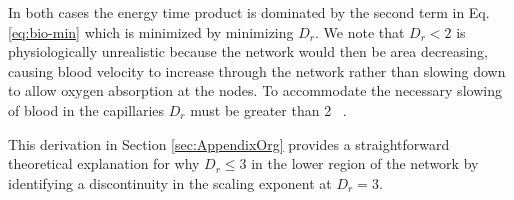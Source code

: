 \documentclass[12pt]{article}
\begin{document}




In both cases the energy time product is dominated by the second term in Eq. \ref{eq:bio-min} which is minimized by minimizing $D_r$. We note that $D_r < 2$ is physiologically unrealistic because the network would then be area decreasing, causing blood velocity to increase through the network rather than slowing down to allow oxygen absorption at the nodes. To accommodate the necessary slowing of blood in the capillaries $D_r$ must be greater than 2 ~\cite{west97}.



This derivation in Section \ref{sec:AppendixOrg} provides a straightforward theoretical explanation for why $D_r \leq 3$ in the lower region of the network by identifying a discontinuity in the scaling exponent at $D_r = 3$.



\end{document}
